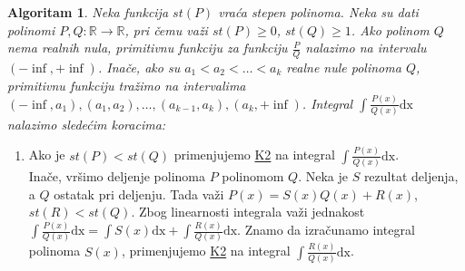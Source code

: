 \documentclass{article}
\newtheorem{alg}{Algoritam}[section]
\begin{document}
\begin{algbox}
    \begin{alg}
        Neka funkcija $st(P)$ vraća stepen polinoma.
        Neka su dati polinomi $P, Q: \mathbb{R} \longrightarrow \mathbb{R}$, pri čemu
        važi $st(P)\geq0$, $st(Q)\geq1$. Ako polinom $Q$ nema realnih nula, primitivnu funkciju
        za funkciju $\frac{P}{Q}$ nalazimo na intervalu $(-\inf, +\inf)$. Inače,
        ako su $a_1 < a_2 < \dotsc < a_k$ realne nule polinoma $Q$, primitivnu funkciju
        tražimo na intervalima $(-\inf, a_1),(a_1, a_2),\dotsc,(a_{k-1},a_k),(a_k,+\inf)$.
        Integral $\int \frac{P(x)}{Q(x)}\text{dx}$ nalazimo sledećim koracima:
    \end{alg}
    \begin{enumerate}[label=\text{K\arabic*}]
        \item\label{Algoritam_1_K1}
              Ako je $st(P) < st(Q)$ primenjujemo \hyperref[Algoritam_1_K2]{K2} na integral $\int \frac{P(x)}{Q(x)}\text{dx}$.\\
              Inače, vršimo deljenje polinoma $P$ polinomom $Q$.
              Neka je $S$ rezultat deljenja, a $Q$ ostatak pri deljenju.
              Tada važi $P(x) = S(x)Q(x) + R(x)$, $st(R)<st(Q)$.
              Zbog linearnosti integrala važi jednakost $\int\frac{P(x)}{Q(x)}\text{dx} = \int S(x)\text{dx} + \int\frac{R(x)}{Q(x)}\text{dx}$.
              Znamo da izračunamo integral polinoma $S(x)$, primenjujemo \hyperref[Algoritam_1_K2]{K2}
              na integral $\int \frac{R(x)}{Q(x)}\text{dx}$.


\end{enumerate}
\end{algbox}
\end{document}
